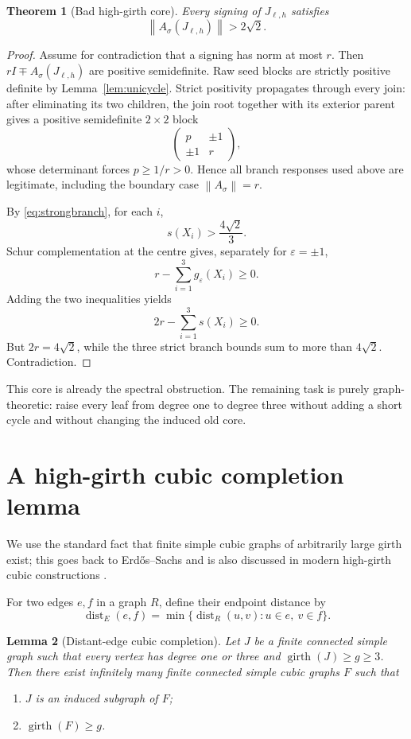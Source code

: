 \documentclass[11pt]{article}
\newtheorem{theorem}{Theorem}[section]
\newtheorem{lemma}[theorem]{Lemma}
\newcommand{\eps}{\varepsilon}
\newcommand{\sgn}{\sigma}
\newcommand{\norm}[1]{\left\lVert #1\right\rVert}
\begin{document}
\begin{theorem}[Bad high-girth core]\label{thm:badcore}
Every signing of $J_{\ell,h}$ satisfies
\[
 \norm{A_\sgn(J_{\ell,h})}>2\sqrt2.
\]
\end{theorem}

\begin{proof}
Assume for contradiction that a signing has norm at most $r$.  Then $rI\mp A_\sgn(J_{\ell,h})$ are positive semidefinite.  Raw seed blocks are strictly positive definite by Lemma~\ref{lem:unicycle}.  Strict positivity propagates through every join: after eliminating its two children, the join root together with its exterior parent gives a positive semidefinite $2\times2$ block
\[
 \begin{pmatrix}p&\pm1\\ \pm1&r\end{pmatrix},
\]
whose determinant forces $p\ge1/r>0$.  Hence all branch responses used above are legitimate, including the boundary case $\norm{A_\sgn}=r$.

By \eqref{eq:strongbranch}, for each $i$,
\[
 s(X_i)>\frac{4\sqrt2}{3}.
\]
Schur complementation at the centre gives, separately for $\eps=\pm1$,
\[
 r-\sum_{i=1}^3g_\eps(X_i)\ge0.
\]
Adding the two inequalities yields
\[
 2r-\sum_{i=1}^3s(X_i)\ge0.
\]
But $2r=4\sqrt2$, while the three strict branch bounds sum to more than $4\sqrt2$.  Contradiction.
\end{proof}

This core is already the spectral obstruction.  The remaining task is purely graph-theoretic: raise every leaf from degree one to degree three without adding a short cycle and without changing the induced old core.

\section{A high-girth cubic completion lemma}

We use the standard fact that finite simple cubic graphs of arbitrarily large girth exist; this goes back to Erd\H{o}s--Sachs \cite{ErdosSachs1963} and is also discussed in modern high-girth cubic constructions \cite{Haythorpe2019}.

For two edges $e,f$ in a graph $R$, define their endpoint distance by
\[
 \operatorname{dist}_E(e,f)
 =\min\{\operatorname{dist}_R(u,v):u\in e,\ v\in f\}.
\]

\begin{lemma}[Distant-edge cubic completion]\label{lem:completion}
Let $J$ be a finite connected simple graph such that every vertex has degree one or three and $\operatorname{girth}(J)\ge g\ge3$.  Then there exist infinitely many finite connected simple cubic graphs $F$ such that
\begin{enumerate}[label=(\roman*)]
\item $J$ is an induced subgraph of $F$;
\item $\operatorname{girth}(F)\ge g$.
\end{enumerate}
\end{lemma}
\end{document}
